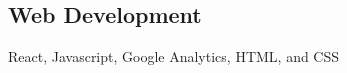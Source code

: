 \documentclass[../Resume.tex]{subfiles}
\begin{document}
	\subsection{Web Development}
	React, Javascript, Google Analytics, HTML, and CSS
	\vspace*{-4mm}
\end{document}
